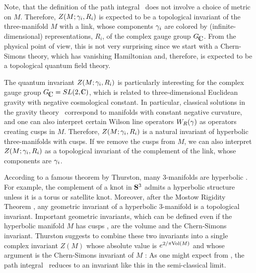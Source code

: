 
Note, that the definition of the path integral \zwpathint\
does not involve a choice of metric on $M$.
Therefore, $Z(M;\g_i, R_i)$ is expected to be a topological
invariant of the three-manifold $M$ with a link, whose components
$\g_i$ are colored by (infinite-dimensional) representations, $R_i$,
of the complex gauge group $\CCG$. From the physical point of view,
this is not very surprising since we start with a Chern-Simons theory,
which has vanishing Hamiltonian and, therefore, is expected to be
a topological quantum field theory.

The quantum invariant $Z(M;\g_i, R_i)$ is particularly interesting
for the complex gauge group $\CCG=SL(2,\IC)$,
which is related to
three-dimensional Euclidean gravity with negative cosmological
constant. In particular, classical solutions in the gravity
theory \igrav\ correspond to manifolds with constant negative
curvature, and one can also interpret certain
Wilson line operators $W_R (\g)$
as operators creating cusps in $M$. Therefore, $Z(M;\g_i, R_i)$
is a natural invariant of hyperbolic three-manifolds with cusps.
If we remove the cusps from $M$, we can also interpret
$Z(M;\g_i, R_i)$ as a topological invariant of the complement
of the link, whose components are $\g_i$.

According to a famous theorem by Thurston, many 3-manifolds
are hyperbolic \Thurston.
For example, the complement of a knot in $\S^3$ admits a hyperbolic
structure unless it is a torus or satellite knot.
Moreover, after the Mostow Rigidity Theorem \Mostow, any geometric
invariant of a hyperbolic 3-manifold is a topological invariant.
Important geometric invariants, which can be defined even if
the hyperbolic manifold $M$ has cusps \Meyerhoff,
are the volume and the Chern-Simons invariant.
Thurston suggests to combine these two invariants into a single
complex invariant $Z(M)$ whose absolute value is $e^{2/\pi \Vol (M)}$
and whose argument is the Chern-Simons invariant of $M$ \Thurston:
%
\eqn{}
%
As one might expect from \iks, the path integral \zpathint\
reduces to an invariant like this in the semi-classical limit.


